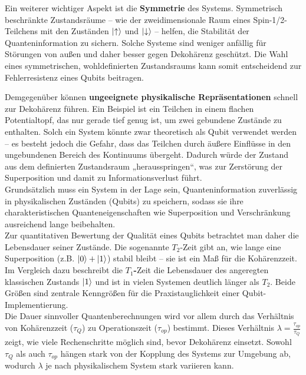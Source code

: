 Ein weiterer wichtiger Aspekt ist die \textbf{Symmetrie} des Systems. Symmetrisch beschränkte Zustandsräume – wie der zweidimensionale Raum eines Spin-1/2-Teilchens mit den Zuständen $\ket{\uparrow}$ und $\ket{\downarrow}$ – helfen, die Stabilität der Quanteninformation zu sichern. Solche Systeme sind weniger anfällig für Störungen von außen und daher besser gegen Dekohärenz geschützt. Die Wahl eines symmetrischen, wohldefinierten Zustandsraums kann somit entscheidend zur Fehlerresistenz eines Qubits beitragen.

Demgegenüber können \textbf{ungeeignete physikalische Repräsentationen} schnell zur Dekohärenz führen. Ein Beispiel ist ein Teilchen in einem flachen Potentialtopf, das nur gerade tief genug ist, um zwei gebundene Zustände zu enthalten. Solch ein System könnte zwar theoretisch als Qubit verwendet werden – es besteht jedoch die Gefahr, dass das Teilchen durch äußere Einflüsse in den ungebundenen Bereich des Kontinuums übergeht. Dadurch würde der Zustand aus dem definierten Zustandsraum „herausspringen“, was zur Zerstörung der Superposition und damit zu Informationsverlust führt.\\

Grundsätzlich muss ein System in der Lage sein, Quanteninformation zuverlässig in physikalischen Zuständen (Qubits) zu speichern, sodass sie ihre charakteristischen Quanteneigenschaften wie Superposition und Verschränkung ausreichend lange beibehalten. \\
Zur quantitativen Bewertung der Qualität eines Qubits betrachtet man daher die Lebensdauer seiner Zustände. Die sogenannte \textbf{$T_2$}-Zeit gibt an, wie lange eine Superposition (z.B. 
$\ket{0} + \ket{1}$) stabil bleibt – sie ist ein Maß für die Kohärenzzeit. \\
Im Vergleich dazu beschreibt die \textbf{$T_1$-}Zeit die Lebensdauer des angeregten klassischen Zustands $\ket{1}$ und ist in vielen Systemen deutlich länger als $T_2$. Beide Größen sind zentrale Kenngrößen für die Praxistauglichkeit einer Qubit-Implementierung.\\

Die Dauer sinnvoller Quantenberechnungen wird vor allem durch das Verhältnis von Kohärenzzeit (\(\tau_Q\)) zu Operationszeit (\(\tau_{op}\)) bestimmt. Dieses Verhältnis 
\(\lambda = \frac{\tau_{op}}{\tau_Q}\) zeigt, wie viele Rechenschritte möglich sind, bevor Dekohärenz einsetzt. Sowohl \(\tau_Q\) als auch \(\tau_{op}\) hängen stark von der Kopplung des Systems zur Umgebung ab, wodurch \(\lambda\) je nach physikalischem System stark variieren kann. \\

